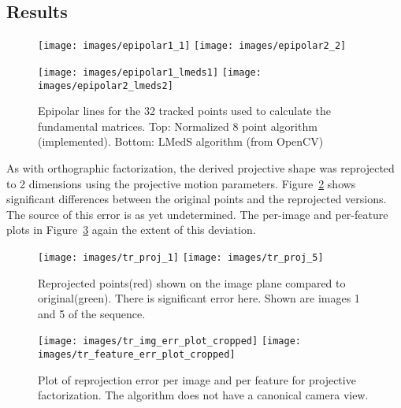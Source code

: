 \documentclass{article}
\begin{document}
\subsection{Results}
\begin{figure}[htb]
	 \centerline{
	    \mbox{\texttt{[image: images/epipolar1\_1]}}
		\mbox{\texttt{[image: images/epipolar2\_2]}}
	}
	\centerline{
		\mbox{\texttt{[image: images/epipolar1\_lmeds1]}}
		\mbox{\texttt{[image: images/epipolar2\_lmeds2]}}
	}
	\caption{Epipolar lines for the 32 tracked points used to calculate the
	fundamental matrices.  Top: Normalized 8 point algorithm (implemented). Bottom: LMedS algorithm (from OpenCV)}
	\label{fig:epi}
\end{figure}
As with orthographic factorization, the derived projective shape was reprojected to 2 dimensions using the projective motion parameters.  Figure~\ref{fig:tr_reproj} shows significant differences
between the original points and the reprojected versions.  The source of this error is as yet undetermined.  The per-image and per-feature plots in Figure~\ref{fig:tr_plots} again the extent of this deviation.

\begin{figure}[htb]
	\centerline{
		\mbox{\texttt{[image: images/tr\_proj\_1]}}
		\mbox{\texttt{[image: images/tr\_proj\_5]}}
	}
	\caption{Reprojected points(red) shown on the image plane compared to original(green).  There
	is significant error here.  Shown are images 1 and 5 of the sequence. }
	\label{fig:tr_reproj}
\end{figure}
\begin{figure}[htb]
	\centerline{
		\mbox{\texttt{[image: images/tr\_img\_err\_plot\_cropped]}}
		\mbox{\texttt{[image: images/tr\_feature\_err\_plot\_cropped]}}
	}
	\caption{Plot of reprojection error per image and per feature for projective factorization.    The algorithm does not have a canonical camera view. }
	\label{fig:tr_plots}
\end{figure}


\end{document}

